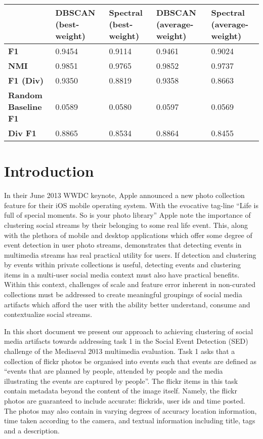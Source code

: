 \documentclass{../acm_proc_article-me11_tweaked}
\begin{document}
\begin{table*}[t!]
\centering
    \begin{tabular}{l|l|l|l|l}
    ~                  & \textbf{DBSCAN (best-weight)} &  \textbf{Spectral (best-weight)} & \textbf{DBSCAN (average-weight)} & \textbf{Spectral (average-weight)} \\
    \hline
    \hline
    \textbf{F1}                 & 0.9454        & 0.9114           & 0.9461           & 0.9024             \\
    \hline
    \textbf{NMI}                & 0.9851        & 0.9765           & 0.9852           & 0.9737             \\
    \hline
    \textbf{F1 (Div)}           & 0.9350        & 0.8819           & 0.9358           & 0.8663             \\
    \hline
    \textbf{Random Baseline F1} & 0.0589        & 0.0580           & 0.0597           & 0.0569             \\
    \hline
    \textbf{Div F1}             & 0.8865        & 0.8534           & 0.8864           & 0.8455             \\
    \end{tabular}
\end{table*}
\section{Introduction}
In their June 2013 WWDC keynote, Apple announced a new photo collection feature for their iOS mobile operating system. With the evocative tag-line ``Life is full of special moments. So is your photo library'' Apple note the importance of clustering social streams by their belonging to some real life event. This, along with the plethora of mobile and desktop applications which offer some degree of event detection in user photo streams, demonstrates that detecting events in multimedia streams has real practical utility for users. If detection and clustering by events within private collections is useful, detecting events and clustering items in a multi-user social media context must also have practical benefits. Within this context, challenges of scale and feature error inherent in non-curated collections must be addressed to create meaningful groupings of social media artifacts which afford the user with the ability better understand, consume and contextualize social streams. 

In this short document we present our approach to achieving clustering of social media artifacts towards addressing task 1 in the Social Event Detection (SED) challenge of the Mediaeval 2013 multimedia evaluation. Task 1 asks that a collection of flickr photos be organised into events such that events are defined as ``events that are planned by people, attended by people and the media illustrating the events are captured by people''. The flickr items in this task contain metadata beyond the content of the image itself. Namely, the flickr photos are guaranteed to include accurate: flickrids, user ids and time posted. The photos may also contain in varying degrees of accuracy location information, time taken according to the camera, and textual information including title, tags and a description. 
\end{document}

